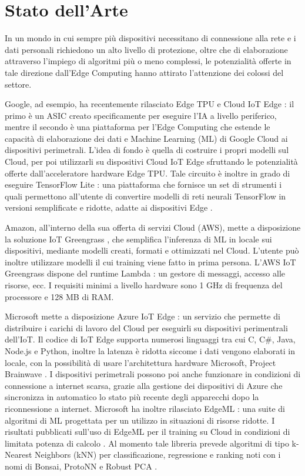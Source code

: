 \chapter{Stato dell'Arte}
In un mondo in cui sempre più dispositivi necessitano di connessione alla rete e i dati personali richiedono un alto livello di protezione, oltre che di elaborazione attraverso l'impiego di algoritmi più o meno complessi, le potenzialità offerte in tale direzione dall'Edge Computing hanno attirato l'attenzione dei colossi del settore.

Google, ad esempio, ha recentemente rilasciato Edge TPU e Cloud IoT Edge \cite{iotgoogle}: il primo è un ASIC creato specificamente per eseguire l'IA a livello periferico, mentre il secondo è una piattaforma per l'Edge Computing che estende le capacità di elaborazione dei dati e Machine Learning (ML) di Google Cloud ai dispositivi perimetrali. L'idea di fondo è quella di costruire i propri modelli sul Cloud, per poi utilizzarli su dispositivi Cloud IoT Edge sfruttando le potenzialità offerte dall'acceleratore hardware Edge TPU. Tale circuito è inoltre in grado di eseguire TensorFlow Lite \cite{tflowlite}: una piattaforma che fornisce un set di strumenti i quali permettono all'utente di convertire modelli di reti neurali TensorFlow in versioni semplificate e ridotte, adatte ai dispositivi Edge \cite{tflowres}.

Amazon, all'interno della sua offerta di servizi Cloud (AWS), mette a disposizione la soluzione IoT Greengrass \cite{aws}, che semplifica l'inferenza di ML in locale sui dispositivi, mediante modelli creati, formati e ottimizzati nel Cloud. L'utente può inoltre utilizzare modelli il cui training viene fatto in prima persona. L'AWS IoT Greengrass dispone del runtime Lambda \cite{lambda}: un gestore di messaggi, accesso alle risorse, ecc. I requisiti minimi a livello hardware sono 1 GHz di frequenza del processore e 128 MB di RAM.

Microsoft mette a disposizione Azure IoT Edge \cite{azure}: un servizio che permette di distribuire i carichi di lavoro del Cloud per eseguirli su dispositivi perimentrali dell'IoT. Il codice di IoT Edge supporta numerosi linguaggi tra cui C, C\#, Java, Node.js e Python, inoltre la latenza è ridotta siccome i dati vengono elaborati in locale, con la possibilità di usare l'architettura hardware Microsoft, Project Brainwave \cite{bwave}. I dispositivi perimetrali possono poi anche funzionare in condizioni di connessione a internet scarsa, grazie alla gestione dei dispositivi di Azure che sincronizza in automatico lo stato più recente degli apparecchi dopo la riconnessione a internet. Microsoft ha inoltre rilasciato EdgeML \cite{edgeml}: una suite di algoritmi di ML progettata per un utilizzo in situazioni di risorse ridotte. I risultati pubblicati sull'uso di EdgeML per il training su Cloud in condizioni di limitata potenza di calcolo \cite{edgemlres}. Al momento tale libreria prevede algoritmi di tipo k-Nearest Neighbors (kNN) per classificazione, regressione e ranking noti con i nomi di Bonsai, ProtoNN e Robust PCA \cite{edgemlalg}.

